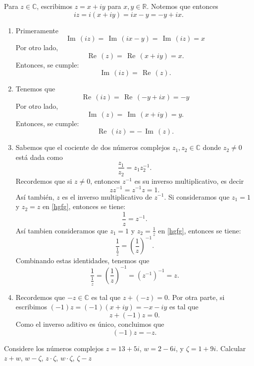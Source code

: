 \documentclass[twoside]{book}
\renewcommand{\Re}{\,\operatorname{Re}\,}
\renewcommand{\Im}{\,\operatorname{Im}\,}
\def\C{\mathbb{C}}
\newcommand{\R}{\mathbb{R}}
\begin{document}
\begin{sol}
    \begin{solucion}{}
        Para $z\in\C$, escribimos $z=x+iy$ para $x,y\in \R$. Notemos que entonces
        \[
            iz=i(x+iy)=ix-y=-y+ix.
        \]
        \begin{enumerate}[label=\alph*).]
            \item Primeramente
                  $$\Im(iz)=\Im(ix-y)=\Im(iz)=x$$
                  Por otro lado,
                  $$\Re(z)=\Re(x+iy)=x.$$
                  Entonces, se cumple:
                  $$\Im(iz)=\Re(z).$$

            \item Tenemos que
                  $$\Re(iz)=\Re(-y+ix)=-y$$
                  Por otro lado,
                  $$\Im(z)=\Im(x+iy)=y.$$
                  Entonces, se cumple:
                  $$\Re(iz)=-\Im(z).$$
            \item Sabemos que el cociente de dos n\'umeros complejos $z_1,z_2\in\C$ donde $z_2\neq0$ est\'a dada como
                  \begin{equation}\label{hgfg}
                      \frac{z_{1}}{z_{2}} = z_{1}z_{2}^{-1}.
                  \end{equation}
                  Recordemos que si $z\neq0$, entonces $z^{-1}$ es su inverso multiplicativo, es decir
                  $$zz^{-1}=z^{-1}z=1.$$
                  As\'i tambi\'en, $z$ es el inverso multiplicativo de $z^{-1}$. Si consideramos que $z_{1}=1$ y $z_{2}=z$ en \eqref{hgfg}, entonces se tiene:
                  $$ \frac{1}{z}=z^{-1}.$$
                  As\'i tambien consideramos que $z_{1}=1$ y $\displaystyle z_{2}=\frac{1}{z}$ en \eqref{hgfg}, entonces se tiene:
                  $$ \frac{1}{\frac{1}{z}}=\left(\frac{1}{z}\right)^{-1}.$$
                  Combinando estas identidades, tenemos que
                  $$\frac{1}{\frac{1}{z}}=\left(\frac{1}{z}\right)^{-1}=(z^{-1})^{-1}=z.$$
            \item Recordemos que $-z\in \C$ es tal que $z+(-z)=0$. Por otra parte, si escribimos $(-1)z=(-1)(x+iy)=-x-iy$ es tal que
                  $$z+(-1)z=0.$$
                  Como el inverso aditivo es \'unico, concluimos que
                  $$(-1)z=-z.$$
        \end{enumerate}
    \end{solucion}
\end{sol}
\begin{example}{}
    Considere los n\'umeros complejos $z=13+5i$, $w=2-6i$, y $\zeta= 1+9i$. Calcular $z+w$, $w-\zeta$, $z \cdot \zeta$, $w \cdot \zeta$, $\zeta-z$
\end{example}
\end{document}
